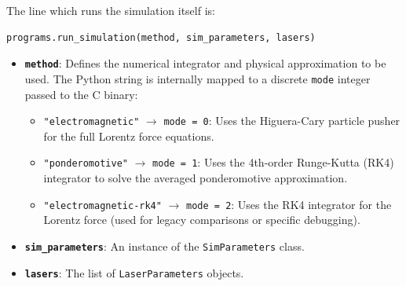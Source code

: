 \documentclass[11pt, a4paper]{article}
\begin{document}
The line which runs the simulation itself is:
\begin{lstlisting}[language=Python]
programs.run_simulation(method, sim_parameters, lasers)
\end{lstlisting}
\begin{itemize}
    \item \textbf{\texttt{method}}: Defines the numerical integrator and physical approximation to be used. The Python string is internally mapped to a discrete \texttt{mode} integer passed to the C binary:
    \begin{itemize}
        \item \texttt{"electromagnetic"} $\rightarrow$ \texttt{mode = 0}: Uses the Higuera-Cary particle pusher for the full Lorentz force equations.
        \item \texttt{"ponderomotive"} $\rightarrow$ \texttt{mode = 1}: Uses the 4th-order Runge-Kutta (RK4) integrator to solve the averaged ponderomotive approximation.
        \item \texttt{"electromagnetic-rk4"} $\rightarrow$ \texttt{mode = 2}: Uses the RK4 integrator for the Lorentz force (used for legacy comparisons or specific debugging).
    \end{itemize}
    \item \textbf{\texttt{sim\_parameters}}: An instance of the \texttt{SimParameters} class.
    \item \textbf{\texttt{lasers}}: The list of \texttt{LaserParameters} objects.
\end{itemize}
\end{document}
